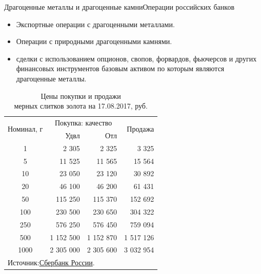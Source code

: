 \documentclass[_Banking_p3.tex]{subfiles}
\begin{document}
\begin{frame}{Драгоценные металлы и драгоценные камни}{Операции российских банков}
\begin{itemize}[<+->]
\item
Экспортные операции с драгоценными металлами. 

\item
Операции с природными драгоценными камнями.

\item
сделки с использованием опционов, свопов, форвардов, фьючерсов и других финансовых инструментов базовым активом по которым являются драгоценные металлы.
\end{itemize}
\end{frame}

\begin{frame}[shrink=25]
\begin{table}[htbp]
  \centering
  \caption{Цены покупки и продажи\\ мерных слитков золота на 17.08.2017, руб.}
    \begin{tabular}{crrr}
    \toprule
   
	\multirow{2}[4]{*}{ Номинал, г} & \multicolumn{2}{c}{Покупка: качество} & 				\multirow{2}[4]{*}{Продажа} \\\cmidrule(lr){2-3}
          & Удвл  & Отл   &  \\
    \midrule
    1     & 2 305 & 2 325 & 3 325 \\
    5     & 11 525 & 11 565 & 15 564 \\
    10    & 23 050 & 23 120 & 30 892 \\
    20    & 46 100 & 46 200 & 61 431 \\
    50    & 115 250 & 115 370 & 152 692 \\
    100   & 230 500 & 230 650 & 304 322 \\
    250   & 576 250 & 576 450 & 759 094 \\
    500   & 1 152 500 & 1 152 870 & 1 517 126 \\
    1000  & 2 305 000 & 2 305 600 & 3 032 954 \\
    \bottomrule
    \multicolumn{4}{l}{Источник:\href{http://www.sberbank.ru/ru/person/contributions/values/metall}{Сбербанк России}.}
    \end{tabular}%
  \label{tab:gold_bar_prices}%
\end{table}%

\end{frame}
\end{document}
